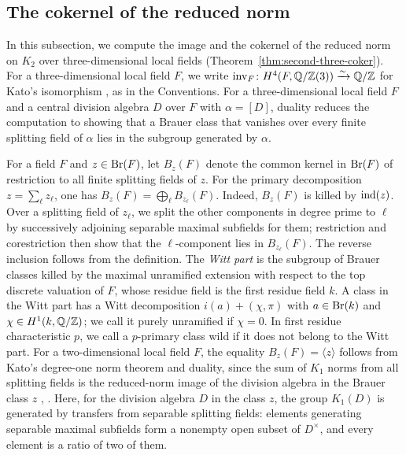 \subsection{The cokernel of the reduced norm}\label{sec:second-three-coker}
In this subsection, we compute the image and the cokernel of the reduced norm on $K_2$ over three-dimensional local fields (Theorem~\ref{thm:second-three-coker}).
For a three-dimensional local field $F$, we write $\operatorname{inv}_F\colon H^4(F,\mathbb Q/\mathbb Z(3))\xrightarrow{\sim}\mathbb Q/\mathbb Z$ for Kato's isomorphism \cite[Theorem 2]{KatoExistence}, as in the Conventions.
For a three-dimensional local field $F$ and a central division algebra $D$ over $F$ with $\alpha=[D]$, duality reduces the computation to showing that a Brauer class that vanishes over every finite splitting field of $\alpha$ lies in the subgroup generated by $\alpha$.

For a field $F$ and $z\in\operatorname{Br}(F)$, let $B_z(F)$ denote the common kernel in $\operatorname{Br}(F)$ of restriction to all finite splitting fields of $z$.
For the primary decomposition $z=\sum_\ell z_\ell$, one has $B_z(F)=\bigoplus_\ell B_{z_\ell}(F)$.
Indeed, $B_z(F)$ is killed by $\operatorname{ind}(z)$.
Over a splitting field of $z_\ell$, we split the other components in degree prime to $\ell$ by successively adjoining separable maximal subfields for them; restriction and corestriction then show that the $\ell$-component lies in $B_{z_\ell}(F)$.
The reverse inclusion follows from the definition.
The \emph{Witt part} is the subgroup of Brauer classes killed by the maximal unramified extension with respect to the top discrete valuation of $F$, whose residue field is the first residue field $k$.
A class in the Witt part has a Witt decomposition $i(a)+(\chi,\pi)$ with $a\in\operatorname{Br}(k)$ and $\chi\in H^1(k,\mathbb Q/\mathbb Z)$; we call it purely unramified if $\chi=0$.
In first residue characteristic $p$, we call a $p$-primary class wild if it does not belong to the Witt part.
For a two-dimensional local field $F$, the equality $B_z(F)=\langle z\rangle$ follows from Kato's degree-one norm theorem and duality, since the sum of $K_1$ norms from all splitting fields is the reduced-norm image of the division algebra in the Brauer class $z$ \cite[\S3.1, Theorem 3(2)]{KatoLocalII}, \cite[Theorem 2]{KatoExistence}.
Here, for the division algebra $D$ in the class $z$, the group $K_1(D)$ is generated by transfers from separable splitting fields: elements generating separable maximal subfields form a nonempty open subset of $D^\times$, and every element is a ratio of two of them.



